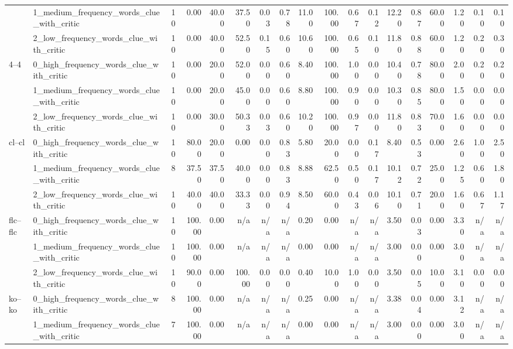 \begin{tabular}{llrrrrrrrrrrrrrrrr}
 & 1_medium_frequency_words_clue_with_critic & 10 & 0.00 & 40.00 & 37.50 & 0.03 & 0.78 & 11.00 & 100.00 & 0.67 & 0.12 & 12.20 & 0.87 & 60.00 & 1.20 & 0.10 & 0.10 \\
 & 2_low_frequency_words_clue_with_critic & 10 & 0.00 & 40.00 & 52.50 & 0.15 & 0.60 & 10.60 & 100.00 & 0.65 & 0.10 & 11.80 & 0.88 & 60.00 & 1.20 & 0.20 & 0.30 \\
\cline{1-18}
\multirow[t]{3}{*}{4--4} & 0_high_frequency_words_clue_with_critic & 10 & 0.00 & 20.00 & 52.00 & 0.00 & 0.60 & 8.40 & 100.00 & 1.00 & 0.00 & 10.40 & 0.78 & 80.00 & 2.00 & 0.20 & 0.20 \\
 & 1_medium_frequency_words_clue_with_critic & 10 & 0.00 & 20.00 & 45.00 & 0.00 & 0.60 & 8.80 & 100.00 & 0.90 & 0.00 & 10.30 & 0.85 & 80.00 & 1.50 & 0.00 & 0.00 \\
 & 2_low_frequency_words_clue_with_critic & 10 & 0.00 & 30.00 & 50.33 & 0.03 & 0.60 & 10.20 & 100.00 & 0.97 & 0.00 & 11.80 & 0.83 & 70.00 & 1.60 & 0.00 & 0.00 \\
\cline{1-18}
\multirow[t]{3}{*}{cl--cl} & 0_high_frequency_words_clue_with_critic & 10 & 80.00 & 20.00 & 0.00 & 0.00 & 0.83 & 5.80 & 20.00 & 0.00 & 0.17 & 8.40 & 0.53 & 0.00 & 2.60 & 1.00 & 2.50 \\
 & 1_medium_frequency_words_clue_with_critic & 8 & 37.50 & 37.50 & 40.00 & 0.00 & 0.83 & 8.88 & 62.50 & 0.50 & 0.17 & 10.12 & 0.72 & 25.00 & 1.25 & 0.60 & 1.80 \\
 & 2_low_frequency_words_clue_with_critic & 10 & 40.00 & 40.00 & 33.33 & 0.00 & 0.94 & 8.50 & 60.00 & 0.43 & 0.06 & 10.10 & 0.71 & 20.00 & 1.60 & 0.67 & 1.17 \\
\cline{1-18}
\multirow[t]{3}{*}{flc--flc} & 0_high_frequency_words_clue_with_critic & 10 & 100.00 & 0.00 & n/a & n/a & n/a & 0.20 & 0.00 & n/a & n/a & 3.50 & 0.03 & 0.00 & 3.30 & n/a & n/a \\
 & 1_medium_frequency_words_clue_with_critic & 10 & 100.00 & 0.00 & n/a & n/a & n/a & 0.00 & 0.00 & n/a & n/a & 3.00 & 0.00 & 0.00 & 3.00 & n/a & n/a \\
 & 2_low_frequency_words_clue_with_critic & 10 & 90.00 & 0.00 & 100.00 & 0.00 & 0.00 & 0.40 & 10.00 & 1.00 & 0.00 & 3.50 & 0.05 & 10.00 & 3.10 & 0.00 & 0.00 \\
\cline{1-18}
\multirow[t]{3}{*}{ko--ko} & 0_high_frequency_words_clue_with_critic & 8 & 100.00 & 0.00 & n/a & n/a & n/a & 0.25 & 0.00 & n/a & n/a & 3.38 & 0.04 & 0.00 & 3.12 & n/a & n/a \\
 & 1_medium_frequency_words_clue_with_critic & 7 & 100.00 & 0.00 & n/a & n/a & n/a & 0.00 & 0.00 & n/a & n/a & 3.00 & 0.00 & 0.00 & 3.00 & n/a & n/a \\

\end{tabular}
